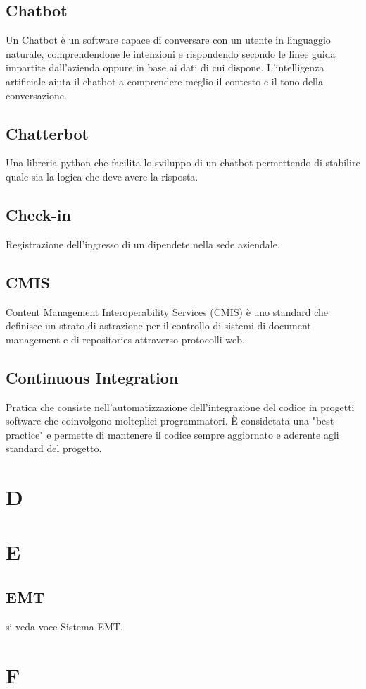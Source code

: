 \subsection{Chatbot}
Un Chatbot è un software capace di conversare con un utente in linguaggio naturale, comprendendone 
le intenzioni e rispondendo secondo le linee guida impartite dall'azienda oppure in 
base ai dati di cui dispone. L'intelligenza artificiale aiuta il chatbot a comprendere meglio il 
contesto e il tono della conversazione.
\subsection{Chatterbot}
Una libreria python che facilita lo sviluppo di un chatbot permettendo di stabilire quale sia la logica che deve avere la risposta.
\subsection{Check-in}
Registrazione dell'ingresso di un dipendete nella sede aziendale.
\subsection{CMIS}
Content Management Interoperability Services (CMIS) è uno standard che definisce un strato di astrazione per il controllo di
sistemi di document management e di repositories attraverso protocolli web.
\subsection{Continuous Integration}
Pratica che consiste nell'automatizzazione dell'integrazione del codice in progetti software che coinvolgono
molteplici programmatori. È considetata una "best practice" e permette di mantenere il codice sempre aggiornato e 
aderente agli standard del progetto.
\newpage
\section{D}
\section{E}
\subsection{EMT}
si veda voce Sistema EMT.
\newpage
\section{F}
